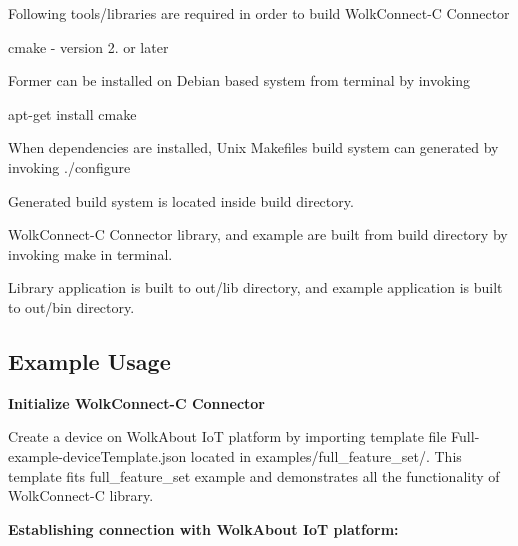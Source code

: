 Following tools/libraries are required in order to build Wolk\+Connect-\/C Connector


\begin{DoxyItemize}
\item cmake -\/ version 2. or later
\end{DoxyItemize}

Former can be installed on Debian based system from terminal by invoking

{\ttfamily apt-\/get install cmake}

When dependencies are installed, Unix Makefiles build system can generated by invoking {\ttfamily ./configure}

Generated build system is located inside {\ttfamily build} directory.

Wolk\+Connect-\/C Connector library, and example are built from {\ttfamily build} directory by invoking {\ttfamily make} in terminal.

Library application is built to {\ttfamily out/lib} directory, and example application is built to {\ttfamily out/bin} directory.

\subsection*{Example Usage }

{\bfseries Initialize Wolk\+Connect-\/C Connector}

Create a device on Wolk\+About IoT platform by importing template file {\ttfamily Full-\/example-\/device\+Template.\+json} located in {\ttfamily examples/full\+\_\+feature\+\_\+set/}. This template fits {\ttfamily full\+\_\+feature\+\_\+set} example and demonstrates all the functionality of Wolk\+Connect-\/C library.

{\bfseries Establishing connection with Wolk\+About IoT platform\+:}


